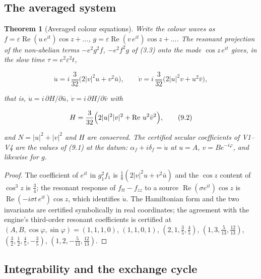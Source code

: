 \documentclass[11pt]{article}
\newtheorem{theorem}{Theorem}[section]
\theoremstyle{remark}
\begin{document}
\subsection{The averaged system}

\begin{theorem}[Averaged colour equations]
\label{thm:v20v6-averaged}
Write the colour waves as \(f=\varepsilon\operatorname{Re}(u\,e^{it})\cos z+\dots\),
\(g=\varepsilon\operatorname{Re}(v\,e^{it})\cos z+\dots\).  The resonant
projection of the non-abelian terms \(-e^2g^2f\), \(-e^2f^2g\) of (3.3)
onto the mode \(\cos z\,e^{it}\) gives, in the slow time
\(\tau=e^2\varepsilon^2t\),

\[
 \dot u=i\,\frac3{32}\bigl(2|v|^2u+v^2\bar u\bigr),\qquad
 \dot v=i\,\frac3{32}\bigl(2|u|^2v+u^2\bar v\bigr),                     \tag{9.1}
\]

that is, \(\dot u=i\,\partial H/\partial\bar u\), \(\dot v=i\,\partial H/\partial\bar v\)
with

\[
 H=\frac3{32}\Bigl(2|u|^2|v|^2+\operatorname{Re}\,u^2\bar v^2\Bigr),      \tag{9.2}
\]

and \(N=|u|^2+|v|^2\) and \(H\) are conserved.  The certified secular
coefficients of V1--V4 are the values of (9.1) at the datum:
\(\alpha_f+i\delta_f=\dot u\) at \(u=A\), \(v=Be^{-i\varphi}\), and
likewise for \(g\).
\end{theorem}

\begin{proof}
The coefficient of \(e^{it}\) in \(g_1^2f_1\) is
\(\tfrac18(2|v|^2u+v^2\bar u)\) and the \(\cos z\) content of
\(\cos^3z\) is \(\tfrac34\); the resonant response of \(f_{tt}-f_{zz}\)
to a source \(\operatorname{Re}(\sigma e^{it})\cos z\) is
\(\operatorname{Re}(-i\sigma t\,e^{it})\cos z\), which identifies
\(\dot u\).  The Hamiltonian form and the two invariants are
certified symbolically in real coordinates; the agreement with the
engine's third-order resonant coefficients is certified at
\((A,B,\cos\varphi,\sin\varphi)=(1,1,1,0)\), \((1,1,0,1)\),
\((2,1,\tfrac35,\tfrac45)\), \((1,3,\tfrac5{13},\tfrac{12}{13})\),
\((\tfrac32,\tfrac12,\tfrac45,-\tfrac35)\), \((1,2,-\tfrac5{13},\tfrac{12}{13})\).
\end{proof}

\subsection{Integrability and the exchange cycle}
\end{document}
